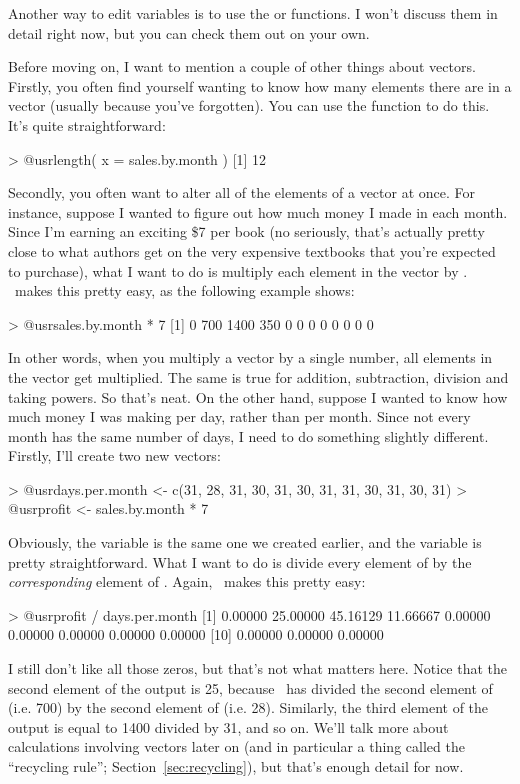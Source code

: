 Another way to edit variables is to use the  or  functions. I won't discuss them in detail right now, but you can check them out on your own. 



Before moving on, I want to mention a couple of other things about vectors. Firstly, you often find yourself wanting to know how many elements there are in a vector (usually because you've forgotten). You can use the  function to do this. It's quite straightforward:
\begin{rblock1}
> @usr{length( x = sales.by.month )}
[1] 12
\end{rblock1}

\noindent
Secondly, you often want to alter all of the elements of a vector at once. For instance, suppose I wanted to figure out how much money I made in each month. Since I'm earning an exciting \$7 per book (no seriously, that's actually pretty close to what authors get on the very expensive textbooks that you're expected to purchase), what I want to do is multiply each element in the  vector by . \R\ makes this pretty easy, as the following example shows:
\begin{rblock1}
> @usr{sales.by.month * 7}
 [1]    0  700 1400  350    0    0    0    0    0    0    0    0
\end{rblock1}
In other words, when you multiply a vector by a single number, all elements in the vector get multiplied. The same is true for addition, subtraction, division and taking powers. So that's neat. On the other hand, suppose I wanted to know how much money I was making per day, rather than per month. Since not every month has the same number of days, I need to do something slightly different. Firstly, I'll create two new vectors:
\begin{rblock1}
> @usr{days.per.month <- c(31, 28, 31, 30, 31, 30, 31, 31, 30, 31, 30, 31)}
> @usr{profit <- sales.by.month * 7}
\end{rblock1}
Obviously, the  variable is the same one we created earlier, and the  variable is pretty straightforward. What I want to do is divide every element of  by the {\it corresponding} element of . Again, \R\ makes this pretty easy:
\begin{rblock1}
> @usr{profit / days.per.month}
 [1]  0.00000 25.00000 45.16129 11.66667  0.00000  0.00000  0.00000  0.00000  0.00000
[10]  0.00000  0.00000  0.00000
\end{rblock1}
I still don't like all those zeros, but that's not what matters here. Notice that the second element of the output is 25, because \R\ has divided the second element of  (i.e. 700) by the second element of  (i.e. 28). Similarly, the third element of the output is equal to 1400 divided by 31, and so on. We'll talk more about calculations involving vectors later on (and in particular a thing called the ``recycling rule''; Section~\ref{sec:recycling}), but that's enough detail for now.

